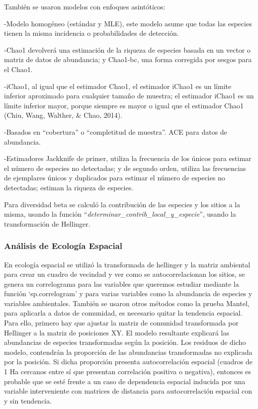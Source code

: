 \documentclass[11pt,]{article}
\begin{document}
También se usaron modelos con enfoques asintóticos:

-Modelo homogéneo (estándar y MLE), este modelo asume que todas las
especies tienen la misma incidencia o probabilidades de detección.

-Chao1 devolverá una estimación de la riqueza de especies basada en un
vector o matriz de datos de abundancia; y Chao1-bc, una forma corregida
por sesgos para el Chao1.

-iChao1, al igual que el estimador Chao1, el estimador iChao1 es un
límite inferior aproximado para cualquier tamaño de muestra; el
estimador iChao1 es un límite inferior mayor, porque siempre es mayor o
igual que el estimador Chao1 (Chiu, Wang, Walther, \& Chao, 2014).

-Basados en ``cobertura'' o ``completitud de muestra''. ACE para datos
de abundancia.

-Estimadores Jackknife de primer, utiliza la frecuencia de los únicos
para estimar el número de especies no detectadas; y de segundo orden,
utiliza las frecuencias de ejemplares únicos y duplicados para estimar
el número de especies no detectadas; estiman la riqueza de especies.

Para diversidad beta se calculó la contribución de las especies y los
sitios a la misma, usando la función
``\emph{determinar\_contrib\_local\_y\_especie}'', usando la
transformación de Hellinger.

\subsubsection{Análisis de Ecología
Espacial}\label{anuxe1lisis-de-ecologuxeda-espacial}

En ecología espacial se utilizó la transformada de hellinger y la matriz
ambiental para crear un cuadro de vecindad y ver como se
autocorrelacionan los sitios, se genera un correlograma para las
variables que queremos estudiar mediante la función `sp.correlogram' y
para varias variables como la abundancia de especies y variables
ambientales. También se usaron otros métodos como la prueba Mantel, para
aplicarla a datos de comunidad, es necesario quitar la tendencia
espacial. Para ello, primero hay que ajustar la matriz de comunidad
transformada por Hellinger a la matriz de posiciones XY. El modelo
resultante explicará las abundancias de especies transformadas según la
posición. Los residuos de dicho modelo, contendrán la proporción de las
abundancias transformadas no explicada por la posición. Si dicha
proporción presenta autocorrelación espacial (cuadros de 1 Ha cercanos
entre sí que presentan correlación positiva o negativa), entonces es
probable que se esté frente a un caso de dependencia espacial inducida
por una variable interveniente con matrices de distancia para
autocorrelación espacial con y sin tendencia.
\end{document}
